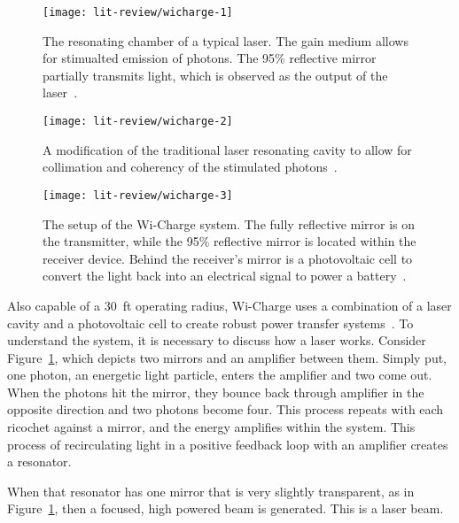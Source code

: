 \begin{figure}[h!]
\centering
\texttt{[image: lit-review/wicharge-1]}
    \caption{The resonating chamber of a typical laser. The gain medium allows for stimualted emission of photons. The 95\% reflective mirror partially transmits light, which is observed as the output of the laser~\cite{wicharge2016}.}
    \label{fig:lit-review-wicharge-1}
\end{figure}
\begin{figure}[h!]
\centering
\texttt{[image: lit-review/wicharge-2]}
    \caption{A modification of the traditional laser resonating cavity to allow for collimation and coherency of the stimulated photons~\cite{wicharge2016}.}
    \label{fig:lit-review-wicharge-2}
\end{figure}
\begin{figure}[h!]
\centering
\texttt{[image: lit-review/wicharge-3]}
    \caption{The setup of the Wi-Charge system. The fully reflective mirror is on the transmitter, while the 95\% reflective mirror is located within the receiver device. Behind the receiver's mirror is a photovoltaic cell to convert the light back into an electrical signal to power a battery~\cite{wicharge2016}.}
    \label{fig:lit-review-wicharge-3}
\end{figure}


Also capable of a 30~ft operating radius, Wi-Charge uses a combination of a laser cavity and a photovoltaic cell to create robust power transfer systems~\cite{wicharge2016}. To understand the system, it is necessary to discuss how a laser works. Consider Figure~\ref{fig:lit-review-wicharge-1}, which depicts two mirrors and an amplifier between them. Simply put, one photon, an energetic light particle, enters the amplifier and two come out. When the photons hit the mirror, they bounce back through amplifier in the opposite direction and two photons become four. This process repeats with each ricochet against a mirror, and the energy amplifies within the system. This process of recirculating light in a positive feedback loop with an amplifier creates a resonator.

When that resonator has one mirror that is very slightly transparent, as in Figure~\ref{fig:lit-review-wicharge-1}, then a focused, high powered beam is generated. This is a laser beam.

